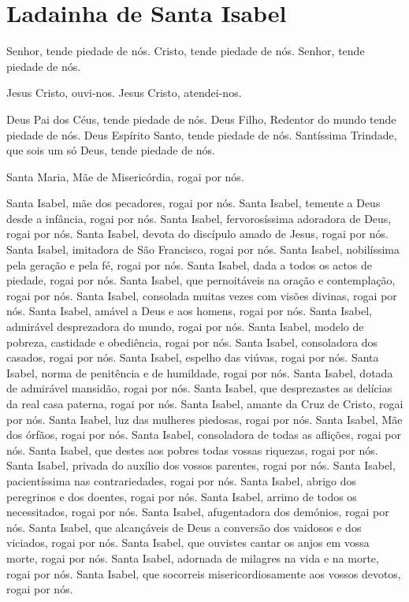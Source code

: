 \section{Ladainha de Santa Isabel}

Senhor, tende piedade de nós.
Cristo, tende piedade de nós.
Senhor, tende piedade de nós.

Jesus Cristo, ouvi-nos.
Jesus Cristo, atendei-nos.

Deus Pai dos Céus, tende piedade de nós.
Deus Filho, Redentor do mundo tende piedade de nós.
Deus Espírito Santo, tende piedade de nós.
Santíssima Trindade, que sois um só Deus, tende piedade de nós.

Santa Maria, Mãe de Misericórdia, rogai por nós.

Santa Isabel, mãe dos pecadores, rogai por nós.
Santa Isabel, temente a Deus desde a infância, rogai por nós.
Santa Isabel, fervorosíssima adoradora de Deus, rogai por nós.
Santa Isabel, devota do discípulo amado de Jesus, rogai por nós.
Santa Isabel, imitadora de São Francisco, rogai por nós.
Santa Isabel, nobilíssima pela geração e pela fé, rogai por nós.
Santa Isabel, dada a todos os actos de piedade, rogai por nós.
Santa Isabel, que pernoitáveis na oração e contemplação, rogai por nós.
Santa Isabel, consolada muitas vezes com visões divinas, rogai por nós.
Santa Isabel, amável a Deus e aos homens, rogai por nós.
Santa Isabel, admirável desprezadora do mundo, rogai por nós.
Santa Isabel, modelo de pobreza, castidade e obediência, rogai por nós.
Santa Isabel, consoladora dos casados, rogai por nós.
Santa Isabel, espelho das viúvas, rogai por nós.
Santa Isabel, norma de penitência e de humildade, rogai por nós.
Santa Isabel, dotada de admirável mansidão, rogai por nós.
Santa Isabel, que desprezastes as delícias da real casa paterna, rogai por nós.
Santa Isabel, amante da Cruz de Cristo, rogai por nós.
Santa Isabel, luz das mulheres piedosas, rogai por nós.
Santa Isabel, Mãe dos órfãos, rogai por nós.
Santa Isabel, consoladora de todas as aflições, rogai por nós.
Santa Isabel, que destes aos pobres todas vossas riquezas, rogai por nós.
Santa Isabel, privada do auxílio dos vossos parentes, rogai por nós.
Santa Isabel, pacientíssima nas contrariedades, rogai por nós.
Santa Isabel, abrigo dos peregrinos e dos doentes, rogai por nós.
Santa Isabel, arrimo de todos os necessitados, rogai por nós.
Santa Isabel, afugentadora dos demónios, rogai por nós.
Santa Isabel, que alcançáveis de Deus a conversão dos vaidosos e dos viciados, rogai por nós.
Santa Isabel, que ouvistes cantar os anjos em vossa morte, rogai por nós.
Santa Isabel, adornada de milagres na vida e na morte, rogai por nós.
Santa Isabel, que socorreis misericordiosamente aos vossos devotos, rogai por nós.

